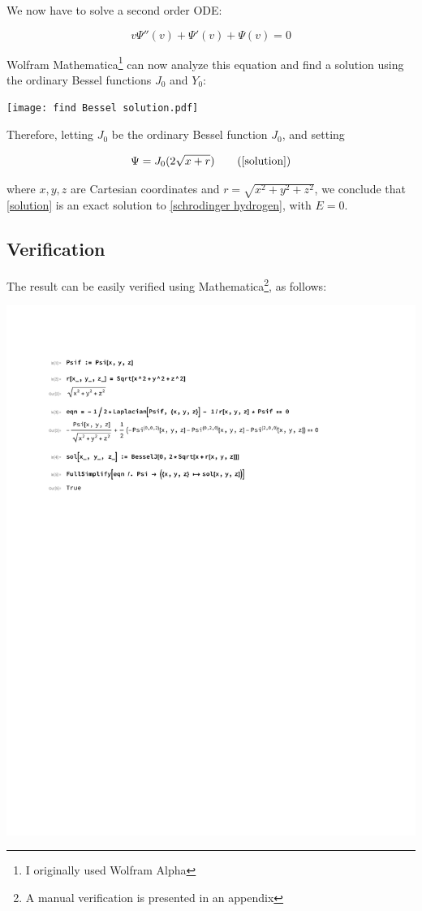 \documentclass{article}
\begin{document}
We now have to solve a second order ODE:

\begin{equation}
v \Psi''(v) + \Psi'(v) + \Psi(v) = 0
\end{equation}

Wolfram Mathematica\footnote{I originally used Wolfram Alpha} can now
analyze this equation and find a solution using the ordinary Bessel functions $J_0$ and $Y_0$:

\texttt{[image: find Bessel solution.pdf]}

Therefore, letting $J_0$ be the ordinary Bessel function $J_0$, and setting

\begin{equation}
\Psi = J_0(2\sqrt{x+r})
\tag{\ref{solution}}
\end{equation}

where $x,y,z$ are Cartesian coordinates and $r=\sqrt{x^2+y^2+z^2}$, we conclude that
\eqref{solution} is an exact solution to \eqref{schrodinger hydrogen}, with $E=0$.

\subsection*{Verification}

\label{verification}
The result can be easily verified using Mathematica\footnote{A manual verification is presented in an appendix}, as follows:

\includegraphics[page=1, clip, trim=1in 7in 1in 1in, width=\textwidth]{improved.pdf}
\end{document}

